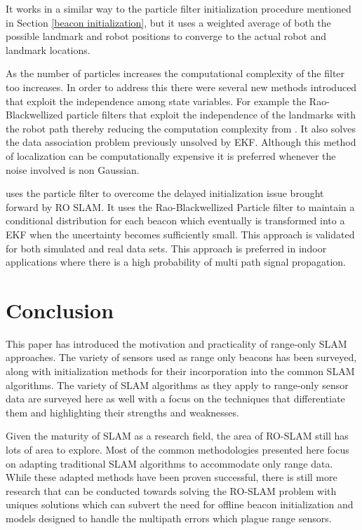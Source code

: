 \documentclass[conference]{IEEEtran}
\begin{document}
It works in a similar way to the particle filter initialization procedure mentioned in Section \ref{beacon initialization}, but it uses a weighted average of both the possible landmark and robot positions to converge to the actual robot and landmark locations.

As the number of particles increases the computational complexity of the filter too increases. In order to address this there were several new methods introduced that  exploit the independence among state variables. For example the Rao-Blackwellized particle filters that exploit the independence of the landmarks with the robot path thereby reducing the computation complexity from \cite{Yuan2012}. It also solves the data association problem previously unsolved by EKF. Although this method of localization can be computationally expensive it is preferred whenever the noise involved is non Gaussian.
	

   \cite{Blanco2008a} uses the particle filter to overcome the delayed initialization issue brought forward by RO SLAM. It uses the Rao-Blackwellized Particle filter to maintain a conditional distribution for each beacon which eventually is transformed into a EKF when the uncertainty becomes sufficiently small. This approach is validated for both simulated and real data sets. This approach is preferred in indoor applications where there is a high probability of multi path signal propagation.

	
	
	
	
	
	
	
	
	
	
	
	
	
	
	
	
	\section{Conclusion}
	\label{conclusion}
	This paper has introduced the motivation and practicality of range-only SLAM approaches. The variety of sensors used as range only beacons has been surveyed, along with initialization methods for their incorporation into the common SLAM algorithms. The variety of SLAM algorithms as they apply to range-only sensor data are surveyed here as well with a focus on the techniques that differentiate them and highlighting their strengths and weaknesses.

	Given the maturity of SLAM as a research field, the area of RO-SLAM still has lots of area to explore. Most of the common methodologies presented here focus on adapting traditional SLAM algorithms to accommodate only range data. While these adapted methods have been proven successful, there is still more research that can be conducted towards solving the RO-SLAM problem with uniques solutions which can subvert the need for offline beacon initialization and models designed to handle the multipath errors which plague range sensors.
	
	
	
	
	
	
	
	
	
	
\end{document}
